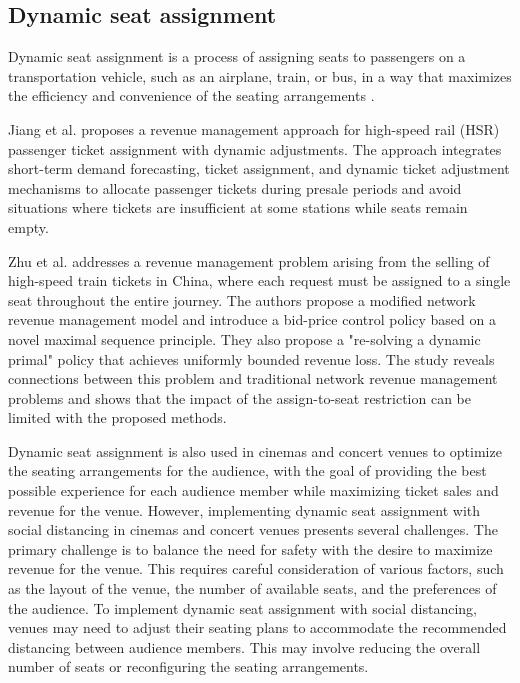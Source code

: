 \subsection{Dynamic seat assignment}
Dynamic seat assignment is a process of assigning seats to passengers on a transportation vehicle, such as an airplane, train, or bus, in a way that maximizes the efficiency and convenience of the seating arrangements \cite{hamdouch2011schedule, berge1993demand}. 

Jiang et al. \cite{jiang2015dynamic} proposes a revenue management approach for high-speed rail (HSR) passenger ticket assignment with dynamic adjustments. The approach integrates short-term demand forecasting, ticket assignment, and dynamic ticket adjustment mechanisms to allocate passenger tickets during presale periods and avoid situations where tickets are insufficient at some stations while seats remain empty.


Zhu et al. \cite{zhu2023assign} addresses a revenue management problem arising from the selling of high-speed train tickets in China, where each request must be assigned to a single seat throughout the entire journey. The authors propose a modified network revenue management model and introduce a bid-price control policy based on a novel maximal sequence principle. They also propose a "re-solving a dynamic primal" policy that achieves uniformly bounded revenue loss. The study reveals connections between this problem and traditional network revenue management problems and shows that the impact of the assign-to-seat restriction can be limited with the proposed methods.

Dynamic seat assignment is also used in cinemas and concert venues to optimize the seating arrangements for the audience, with the goal of providing the best possible experience for each audience member while maximizing ticket sales and revenue for the venue. However, implementing dynamic seat assignment with social distancing in cinemas and concert venues presents several challenges. The primary challenge is to balance the need for safety with the desire to maximize revenue for the venue. This requires careful consideration of various factors, such as the layout of the venue, the number of available seats, and the preferences of the audience. To implement dynamic seat assignment with social distancing, venues may need to adjust their seating plans to accommodate the recommended distancing between audience members. This may involve reducing the overall number of seats or reconfiguring the seating arrangements.

